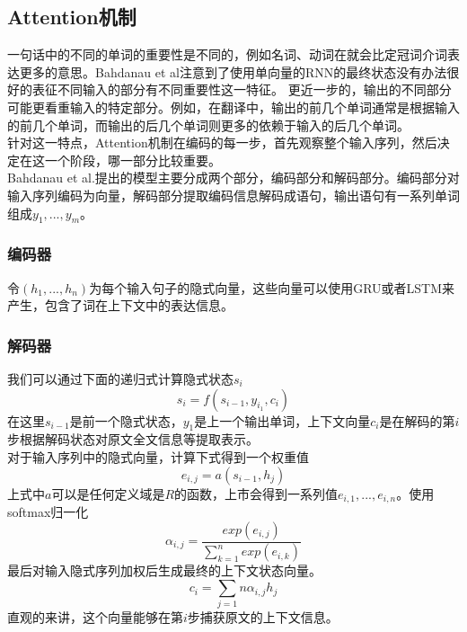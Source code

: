 \subsection{Attention机制}
一句话中的不同的单词的重要性是不同的，例如名词、动词在就会比定冠词介词表达更多的意思。Bahdanau et al\cite{Bahdanauetal.2014}注意到了使用单向量的RNN的最终状态没有办法很好的表征不同输入的部分有不同重要性这一特征。
更近一步的，输出的不同部分可能更看重输入的特定部分。例如，在翻译中，输出的前几个单词通常是根据输入的前几个单词，而输出的后几个单词则更多的依赖于输入的后几个单词。\\
针对这一特点，Attention机制在编码的每一步，首先观察整个输入序列，然后决定在这一个阶段，哪一部分比较重要。\\
Bahdanau et al.提出的模型主要分成两个部分，编码部分和解码部分。编码部分对输入序列编码为向量，解码部分提取编码信息解码成语句，输出语句有一系列单词组成$y_1,...,y_m$。
\subsubsection{编码器}
令$(h_1,...,h_n)$为每个输入句子的隐式向量，这些向量可以使用GRU或者LSTM来产生，包含了词在上下文中的表达信息。
\subsubsection{解码器}
我们可以通过下面的递归式计算隐式状态$s_i$
\begin{equation}
s_i = f(s_{i-1},y_{i_1},c_i)
\end{equation}
在这里$s_{i-1}$是前一个隐式状态，$y_1$是上一个输出单词，上下文向量$c_i$是在解码的第$i$步根据解码状态对原文全文信息等提取表示。\\
对于输入序列中的隐式向量，计算下式得到一个权重值
\begin{equation}
e_{i,j} = a(s_{i-1},h_j)
\end{equation}
上式中$a$可以是任何定义域是$R$的函数，上市会得到一系列值$e_{i,1},...,e_{i,n}$。使用softmax归一化
\begin{equation}
\alpha_{i,j} = \frac{exp(e_{i,j})}{\sum_{k=1}^nexp(e_{i,k})}
\end{equation}
最后对输入隐式序列加权后生成最终的上下文状态向量。
\begin{equation}
c_i = \sum_{j=1}{n}\alpha_{i,j}h_j
\end{equation}
直观的来讲，这个向量能够在第$i$步捕获原文的上下文信息。
